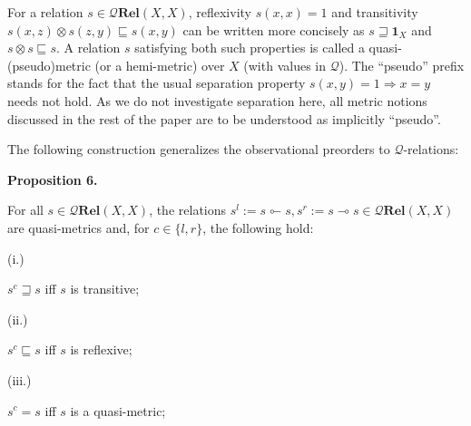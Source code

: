  
For a relation $s\in\mathcal{Q}\textbf{Rel}(X,X)$, reflexivity $s(x,x)=1$ and transitivity $s(x,z)\otimes s(z,y)\sqsubseteq s(x,y)$ can be written more concisely as $s\sqsupseteq\mathbf{1}_{X}$ and $s\otimes s\sqsubseteq s$. A relation $s$ satisfying both such properties is called a quasi-(pseudo)metric (or a hemi-metric) over $X$ (with values in $\mathcal{Q}$). The “pseudo” prefix stands for the fact that the usual separation property $s(x,y)=1\Rightarrow x=y$ needs not hold. As we do not investigate separation here, all metric notions discussed in the rest of the paper are to be understood as implicitly “pseudo”.\par
 
 
 
The following construction generalizes the observational preorders to $\mathcal{Q}$-relations:\par
 
 
 
\par\medskip\noindent\textbf{Proposition 6.}\par
 
 
For all $s\in\mathcal{Q}\mathbf{Rel}(X,X)$, the relations $s^{l}:=s\multimapinv s,s^{r}:=s\multimap s\in\mathcal{Q}\mathbf{Rel}(X,X)$ are quasi-metrics and, for $c\in\{l,r\}$, the following hold:\par
  
\par\noindent  (i.) 
 
$s^{c}\sqsupseteq s$ iff $s$ is transitive;\par
 
 
 
\par\noindent  (ii.) 
 
$s^{c}\sqsubseteq s$ iff $s$ is reflexive;\par
 
 
 
\par\noindent  (iii.) 
 
$s^{c}=s$ iff $s$ is a quasi-metric;\par
 
